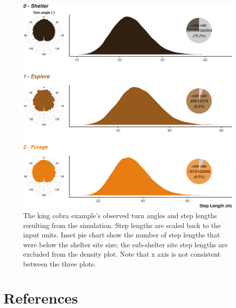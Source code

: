\documentclass[10pt,a4paper]{article}
\begin{document}
\begin{figure}

{\centering \includegraphics{Agent-based_model_walkthrough_files/figure-latex/KINGCOBRAmoveCharFigure-1} 

}

\caption{The king cobra example's observed turn angles and step lengths resulting from the simulation. Step lengths are scaled back to the input units. Inset pie chart show the number of step lengths that were below the shelter site size; the sub-shelter site step lengths are excluded from the density plot. Note that x axis is not consistent between the three plots.}\label{fig:KINGCOBRAmoveCharFigure}
\end{figure}

\clearpage

\hypertarget{references}{%
\section*{References}\label{references}}
\end{document}
